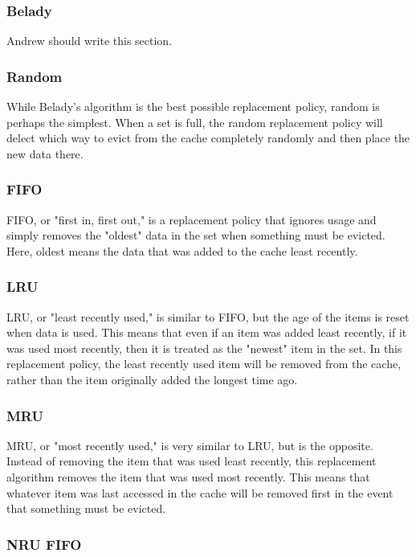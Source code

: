\subsubsection{Belady}
Andrew should write this section.

\subsubsection{Random}

While Belady's algorithm is the best possible replacement policy, random is perhaps the simplest.  When a set is full, the random replacement policy will delect which way to evict from the cache completely randomly and then place the new data there.

\subsubsection{FIFO}

FIFO, or "first in, first out," is a replacement policy that ignores usage and simply removes the "oldest" data in the set when something must be evicted.  Here, oldest means the data that was added to the cache least recently.

\subsubsection{LRU}

LRU, or "least recently used," is similar to FIFO, but the age of the items is reset when data is used.  This means that even if an item was added least recently, if it was used most recently, then it is treated as the "newest" item in the set.  In this replacement policy, the least recently used item will be removed from the cache, rather than the item originally added the longest time ago.

\subsubsection{MRU}

MRU, or "most recently used," is very similar to LRU, but is the opposite.  Instead of removing the item that was used least recently, this replacement algorithm removes the item that was used most recently.  This means that whatever item was last accessed in the cache will be removed first in the event that something must be evicted.

\subsubsection{NRU FIFO}

